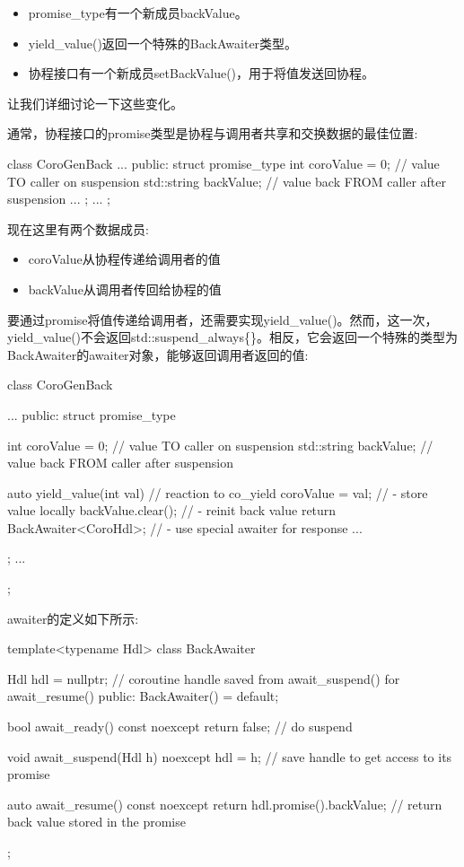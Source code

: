 \begin{itemize}
\item 
promise\_type有一个新成员backValue。

\item 
yield\_value()返回一个特殊的BackAwaiter类型。

\item 
协程接口有一个新成员setBackValue()，用于将值发送回协程。
\end{itemize}

让我们详细讨论一下这些变化。


通常，协程接口的promise类型是协程与调用者共享和交换数据的最佳位置:

\begin{cpp}
class CoroGenBack {
	...
	public:
	struct promise_type {
		int coroValue = 0; // value TO caller on suspension
		std::string backValue; // value back FROM caller after suspension
		...
	};
	...
};
\end{cpp}

现在这里有两个数据成员:

\begin{itemize}
\item 
coroValue从协程传递给调用者的值

\item 
backValue从调用者传回给协程的值
\end{itemize}


要通过promise将值传递给调用者，还需要实现yield\_value()。然而，这一次，yield\_value()不会返回std::suspend\_always\{\}。相反，它会返回一个特殊的类型为BackAwaiter的awaiter对象，能够返回调用者返回的值:

\begin{cpp}
class CoroGenBack {
	...
	public:
	struct promise_type {
		int coroValue = 0; // value TO caller on suspension
		std::string backValue; // value back FROM caller after suspension
		
		auto yield_value(int val) { // reaction to co_yield
			coroValue = val; // - store value locally
			backValue.clear(); // - reinit back value
			return BackAwaiter<CoroHdl>{}; // - use special awaiter for response
		}
		...
	};
	...
};
\end{cpp}

awaiter的定义如下所示:


\begin{cpp}
template<typename Hdl>
class BackAwaiter {
	Hdl hdl = nullptr; // coroutine handle saved from await_suspend() for await_resume()
	public:
	BackAwaiter() = default;
	
	bool await_ready() const noexcept {
		return false; // do suspend
	}
	
	void await_suspend(Hdl h) noexcept {
		hdl = h; // save handle to get access to its promise
	}
	
	auto await_resume() const noexcept {
		return hdl.promise().backValue; // return back value stored in the promise
	}
};
\end{cpp}


